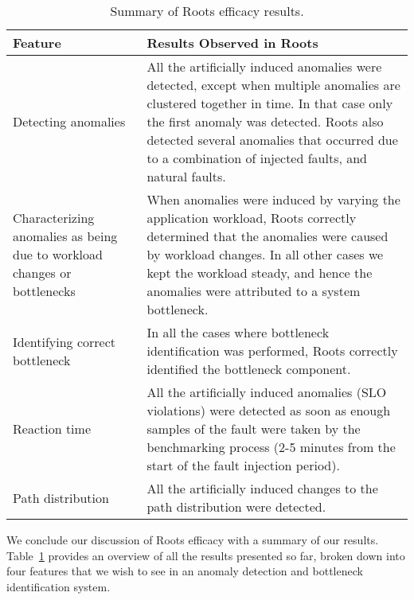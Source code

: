 \begin{table}
\begin{center}
\begin{tabular}{|p{2cm}|p{6cm}|}
\hline
Feature & Results Observed in Roots \\ \hline
Detecting anomalies & 
All the artificially induced anomalies were detected, except when multiple anomalies are
clustered together in time. In that case only the first anomaly was detected.
Roots also detected several anomalies that occurred
due to a combination of injected faults, and natural faults. \\ \hline
Characterizing anomalies as
being due to workload changes or bottlenecks &
When anomalies were induced by varying the application workload, Roots correctly determined
that the anomalies were caused by workload changes. In all other cases
we kept the workload steady, and hence the anomalies were attributed to a
system bottleneck. \\ \hline
Identifying correct bottleneck & 
In all the cases where bottleneck identification was performed, Roots correctly identified 
the bottleneck component. \\ \hline
Reaction time & 
All the artificially induced anomalies (SLO violations) were detected as soon as enough samples of the fault
were taken by the benchmarking process (2-5 minutes from the start of the fault injection period). \\ \hline
Path distribution &
All the artificially induced changes to the path distribution were detected. \\
\hline
\end{tabular}
\end{center}
\caption{Summary of Roots efficacy results.
\label{tab:results_summary}
}
\end{table}

We conclude our discussion of Roots efficacy with a summary of our results. Table~\ref{tab:results_summary}
provides an overview of all the results presented so far, broken down into four features that we wish to see
in an anomaly detection and bottleneck identification system.

